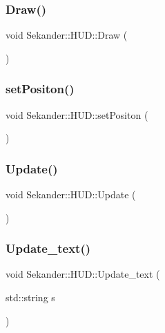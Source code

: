 \subsubsection{\texorpdfstring{Draw()}{Draw()}}
{\footnotesize\ttfamily void Sekander\+::\+H\+U\+D\+::\+Draw (\begin{DoxyParamCaption}{ }\end{DoxyParamCaption})}

\mbox{\label{classSekander_1_1HUD_adae59bd419e3efb72e52039025cc390d}} 
\subsubsection{\texorpdfstring{set\+Positon()}{setPositon()}}
{\footnotesize\ttfamily void Sekander\+::\+H\+U\+D\+::set\+Positon (\begin{DoxyParamCaption}{ }\end{DoxyParamCaption})}

\mbox{\label{classSekander_1_1HUD_ad94d4fa9b5d08ee9b8759b581fd7bc00}} 
\subsubsection{\texorpdfstring{Update()}{Update()}}
{\footnotesize\ttfamily void Sekander\+::\+H\+U\+D\+::\+Update (\begin{DoxyParamCaption}{ }\end{DoxyParamCaption})}

\mbox{\label{classSekander_1_1HUD_a485d26aab99f64815832644f0fba8057}} 
\subsubsection{\texorpdfstring{Update\+\_\+text()}{Update\_text()}}
{\footnotesize\ttfamily void Sekander\+::\+H\+U\+D\+::\+Update\+\_\+text (\begin{DoxyParamCaption}\item[{std\+::string}]{s }\end{DoxyParamCaption})}

